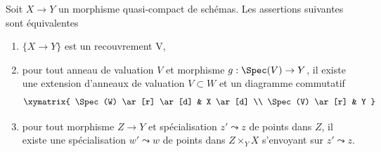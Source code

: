 \begin{lemma}
\label{lemma-refine-qcqs-V}
Soit $X \to Y$ un morphisme quasi-compact de schémas. Les assertions suivantes sont équivalentes
\begin{enumerate}
\item $\{X \to Y\}$ est un recouvrement V,
\item pour tout anneau de valuation $V$ et morphisme $g : \Spec(V) \to Y$, il existe une extension d'anneaux de valuation $V \subset W$ et un diagramme commutatif
$$
\xymatrix{
\Spec(W) \ar[r] \ar[d] & X \ar[d] \\
\Spec(V) \ar[r] & Y
}
$$
\item pour tout morphisme $Z \to Y$ et spécialisation $z' \leadsto z$ de points dans $Z$, il existe une spécialisation $w' \leadsto w$ de points dans $Z \times_Y X$ s'envoyant sur $z' \leadsto z$.
\end{enumerate}
\end{lemma}

